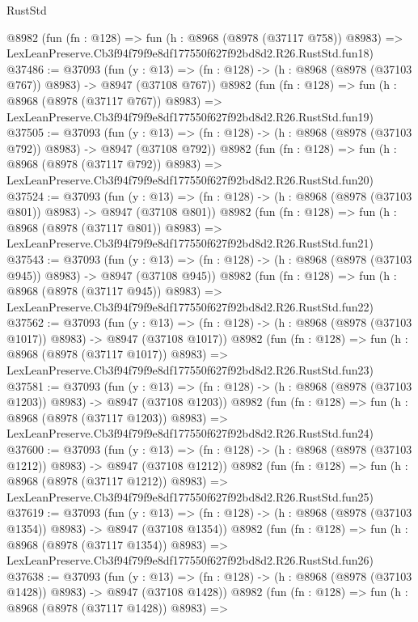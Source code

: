 \begin{lexlean}{RustStd}
\begin{coremodule}
    @8982
    (fun (fn : @128) =>
    fun (h : @8968 (@8978 (@37117 @758)) @8983) =>
    LexLeanPreserve.Cb3f94f79f9e8df177550f627f92bd8d2.R26.RustStd.fun18)
@37486 := @37093
    (fun (y : @13) => (fn : @128) -> (h : @8968 (@8978 (@37103 @767)) @8983) -> @8947 (@37108 @767))
    @8982
    (fun (fn : @128) =>
    fun (h : @8968 (@8978 (@37117 @767)) @8983) =>
    LexLeanPreserve.Cb3f94f79f9e8df177550f627f92bd8d2.R26.RustStd.fun19)
@37505 := @37093
    (fun (y : @13) => (fn : @128) -> (h : @8968 (@8978 (@37103 @792)) @8983) -> @8947 (@37108 @792))
    @8982
    (fun (fn : @128) =>
    fun (h : @8968 (@8978 (@37117 @792)) @8983) =>
    LexLeanPreserve.Cb3f94f79f9e8df177550f627f92bd8d2.R26.RustStd.fun20)
@37524 := @37093
    (fun (y : @13) => (fn : @128) -> (h : @8968 (@8978 (@37103 @801)) @8983) -> @8947 (@37108 @801))
    @8982
    (fun (fn : @128) =>
    fun (h : @8968 (@8978 (@37117 @801)) @8983) =>
    LexLeanPreserve.Cb3f94f79f9e8df177550f627f92bd8d2.R26.RustStd.fun21)
@37543 := @37093
    (fun (y : @13) => (fn : @128) -> (h : @8968 (@8978 (@37103 @945)) @8983) -> @8947 (@37108 @945))
    @8982
    (fun (fn : @128) =>
    fun (h : @8968 (@8978 (@37117 @945)) @8983) =>
    LexLeanPreserve.Cb3f94f79f9e8df177550f627f92bd8d2.R26.RustStd.fun22)
@37562 := @37093
    (fun (y : @13) =>
    (fn : @128) -> (h : @8968 (@8978 (@37103 @1017)) @8983) -> @8947 (@37108 @1017))
    @8982
    (fun (fn : @128) =>
    fun (h : @8968 (@8978 (@37117 @1017)) @8983) =>
    LexLeanPreserve.Cb3f94f79f9e8df177550f627f92bd8d2.R26.RustStd.fun23)
@37581 := @37093
    (fun (y : @13) =>
    (fn : @128) -> (h : @8968 (@8978 (@37103 @1203)) @8983) -> @8947 (@37108 @1203))
    @8982
    (fun (fn : @128) =>
    fun (h : @8968 (@8978 (@37117 @1203)) @8983) =>
    LexLeanPreserve.Cb3f94f79f9e8df177550f627f92bd8d2.R26.RustStd.fun24)
@37600 := @37093
    (fun (y : @13) =>
    (fn : @128) -> (h : @8968 (@8978 (@37103 @1212)) @8983) -> @8947 (@37108 @1212))
    @8982
    (fun (fn : @128) =>
    fun (h : @8968 (@8978 (@37117 @1212)) @8983) =>
    LexLeanPreserve.Cb3f94f79f9e8df177550f627f92bd8d2.R26.RustStd.fun25)
@37619 := @37093
    (fun (y : @13) =>
    (fn : @128) -> (h : @8968 (@8978 (@37103 @1354)) @8983) -> @8947 (@37108 @1354))
    @8982
    (fun (fn : @128) =>
    fun (h : @8968 (@8978 (@37117 @1354)) @8983) =>
    LexLeanPreserve.Cb3f94f79f9e8df177550f627f92bd8d2.R26.RustStd.fun26)
@37638 := @37093
    (fun (y : @13) =>
    (fn : @128) -> (h : @8968 (@8978 (@37103 @1428)) @8983) -> @8947 (@37108 @1428))
    @8982
    (fun (fn : @128) =>
    fun (h : @8968 (@8978 (@37117 @1428)) @8983) =>

\end{coremodule}
\end{lexlean}
